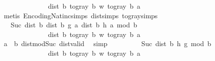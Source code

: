 \begin{isabellebody}
\ \ \ \ \ \ \ \ \ \ \ \ \ {\isacharplus}{\kern0pt}\ dist\ b\ {\isacharparenleft}{\kern0pt}to{\isacharunderscore}{\kern0pt}gray\ b\ w{\isacharparenright}{\kern0pt}\ {\isacharparenleft}{\kern0pt}to{\isacharunderscore}{\kern0pt}gray\ b\ {\isacharquery}{\kern0pt}a{\isacharparenright}{\kern0pt}{\isachardoublequoteclose}\isanewline
\ \ \ \ \ \ \isamarkupfalse%
\ {\isacharparenleft}{\kern0pt}metis\ Encoding{\isacharunderscore}{\kern0pt}Nat{\isachardot}{\kern0pt}inc{\isachardot}{\kern0pt}simps{\isacharparenleft}{\kern0pt}{}{\isacharparenright}{\kern0pt}\ dist{\isachardot}{\kern0pt}simps{\isacharparenleft}{\kern0pt}{}{\isacharparenright}{\kern0pt}\ to{\isacharunderscore}{\kern0pt}gray{\isachardot}{\kern0pt}simps{\isacharparenleft}{\kern0pt}{}{\isacharparenright}{\kern0pt}{\isacharparenright}{\kern0pt}\isanewline
\ \ \ \ \isamarkupfalse%
\ \isamarkupfalse%
\ {\isachardoublequoteopen}{\isachardot}{\kern0pt}{\isachardot}{\kern0pt}{\isachardot}{\kern0pt}\ {\isacharequal}{\kern0pt}\ Suc\ {\isacharparenleft}{\kern0pt}dist{}\ b\ {\isacharparenleft}{\kern0pt}dist{}\ b\ {\isacharquery}{\kern0pt}g\ a{\isacharparenright}{\kern0pt}\ {\isacharparenleft}{\kern0pt}dist{}\ b\ {\isacharquery}{\kern0pt}h\ a{\isacharparenright}{\kern0pt}{\isacharparenright}{\kern0pt}\ mod\ b\isanewline
\ \ \ \ \ \ \ \ \ \ \ \ \ {\isacharplus}{\kern0pt}\ dist\ b\ {\isacharparenleft}{\kern0pt}to{\isacharunderscore}{\kern0pt}gray\ b\ w{\isacharparenright}{\kern0pt}\ {\isacharparenleft}{\kern0pt}to{\isacharunderscore}{\kern0pt}gray\ b\ {\isacharquery}{\kern0pt}a{\isacharparenright}{\kern0pt}{\isachardoublequoteclose}\isanewline
\ \ \ \ \ \ \isamarkupfalse%
\ {\isacartoucheopen}a\ {\isacharless}{\kern0pt}\ b{\isacartoucheclose}\ dist{}{\isacharunderscore}{\kern0pt}mod{\isacharunderscore}{\kern0pt}Suc\ dist{}{\isacharunderscore}{\kern0pt}valid\ \isamarkupfalse%
\ simp\isanewline
\ \ \ \ \isamarkupfalse%
\ \isamarkupfalse%
\ {\isachardoublequoteopen}{\isachardot}{\kern0pt}{\isachardot}{\kern0pt}{\isachardot}{\kern0pt}\ {\isacharequal}{\kern0pt}\ Suc\ {\isacharparenleft}{\kern0pt}dist{}\ b\ {\isacharquery}{\kern0pt}h\ {\isacharquery}{\kern0pt}g{\isacharparenright}{\kern0pt}\ mod\ b\isanewline
\ \ \ \ \ \ \ \ \ \ \ \ \ {\isacharplus}{\kern0pt}\ dist\ b\ {\isacharparenleft}{\kern0pt}to{\isacharunderscore}{\kern0pt}gray\ b\ w{\isacharparenright}{\kern0pt}\ {\isacharparenleft}{\kern0pt}to{\isacharunderscore}{\kern0pt}gray\ b\ {\isacharquery}{\kern0pt}a{\isacharparenright}{\kern0pt}{\isachardoublequoteclose}\isanewline

\end{isabellebody}
